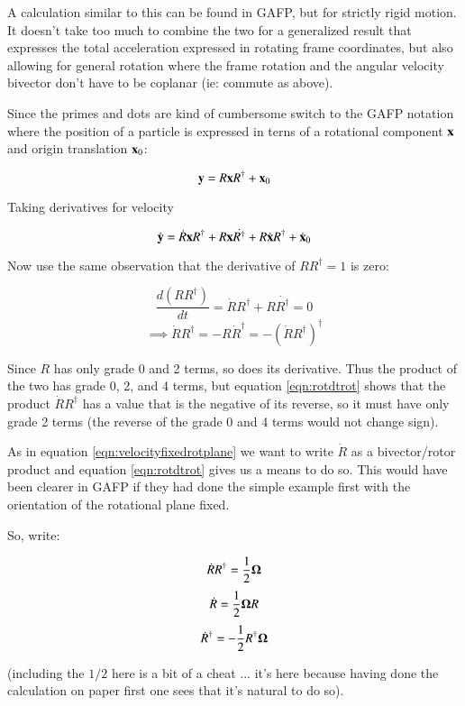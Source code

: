\documentclass{article}      %
\newcommand{\dt}[1]{\dot{#1}}
\newcommand{\BOmega}[0]{\boldsymbol{\Omega}}
\begin{document}
A calculation similar to this can be found in GAFP, but for strictly rigid motion.  It doesn't take too much to combine the two for a generalized result that
expresses the total acceleration expressed in rotating frame coordinates, but also allowing for general rotation where the frame rotation and the angular velocity
bivector don't have to be coplanar (ie: commute as above).

Since the primes and dots are kind of cumbersome switch to the GAFP notation where the position of a particle is expressed in terns of a rotational component $\mathbf{x}$
and origin translation $\mathbf{x}_0$:

\[
\mathbf{y} = R \mathbf{x} R^\dagger + \mathbf{x}_0
\]

Taking derivatives for velocity

\begin{equation}\label{eqn:velocity}
\dt{\By} = \dt{R} \Bx R^\dagger +R \Bx \dt{R^\dagger} +R \dt{\Bx} R^\dagger + \dt{\Bx}_0
\end{equation}

Now use the same observation that the derivative of $R R^\dagger = 1$ is zero:

\begin{equation*}
\frac{d (R R^\dagger)}{dt} = \dt{R}R^\dagger + R \dt{R^\dagger} = 0
\end{equation*}
\begin{equation}\label{eqn:rotdtrot}
\implies
\dt{R}R^\dagger = 
 - R \dt{R}^\dagger = -{\left( \dt{R} R^\dagger \right)}^\dagger
\end{equation}

Since $R$ has only grade 0 and 2 terms, so does its derivative.  Thus the product of the two has grade 0, 2, and 4 terms, but 
equation \ref{eqn:rotdtrot} shows that the product $\dt{R} R^\dagger$ has a value that is the negative of its reverse, so it must have
only grade 2 terms (the reverse of the grade 0 and 4 terms would not change sign).

As in equation \ref{eqn:velocityfixedrotplane} we want to write $\dt{R}$ as a bivector/rotor product and equation \ref{eqn:rotdtrot} gives us a means to do so.
This would have been clearer in GAFP if they had done the simple example first with the orientation of the rotational plane fixed.

So, write:

\[
\dt{R}R^\dagger = \inv{2}\BOmega
\]
\[
\dt{R} = \inv{2}\BOmega R
\]
\[
\dt{R}^\dagger = - \inv{2} R^\dagger \BOmega
\]

(including the $1/2$ here is a bit of a cheat ... it's here because having done the calculation on paper first one sees that it's natural to do so).
\end{document}
